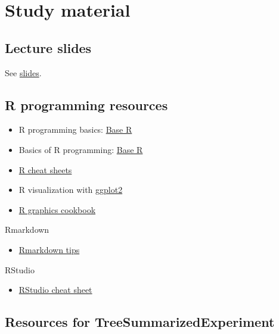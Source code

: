 \documentclass[
  oneside]{book}
\providecommand{\tightlist}{%
  \setlength{\itemsep}{0pt}\setlength{\parskip}{0pt}}
\begin{document}
\hypertarget{study-material}{%
\chapter{Study material}\label{study-material}}

\hypertarget{lecture-slides}{%
\section{Lecture slides}\label{lecture-slides}}

See \href{https://github.com/microbiome/course_2021_radboud/tree/main/slides}{slides}.

\hypertarget{r-programming-resources}{%
\section{R programming resources}\label{r-programming-resources}}

\begin{itemize}
\tightlist
\item
  R programming basics: \href{https://www.rstudio.com/wp-content/uploads/2016/10/r-cheat-sheet-3.pdf}{Base R}
\item
  Basics of R programming: \href{https://raw.githubusercontent.com/rstudio/cheatsheets/master/base-r.pdf}{Base R}
\item
  \href{https://www.rstudio.com/resources/cheatsheets/}{R cheat sheets}
\item
  R visualization with \href{https://www.rstudio.com/wp-content/uploads/2016/11/ggplot2-cheatsheet-2.1.pdf}{ggplot2}
\item
  \href{http://www.cookbook-r.com/Graphs/}{R graphics cookbook}
\end{itemize}

Rmarkdown

\begin{itemize}
\tightlist
\item
  \href{https://rmarkdown.rstudio.com/}{Rmarkdown tips}
\end{itemize}

RStudio

\begin{itemize}
\tightlist
\item
  \href{https://www.rstudio.com/wp-content/uploads/2016/01/rstudio-IDE-cheatsheet.pdf}{RStudio cheat sheet}
\end{itemize}

\hypertarget{resources-for-treesummarizedexperiment}{%
\section{Resources for TreeSummarizedExperiment}\label{resources-for-treesummarizedexperiment}}
\end{document}
